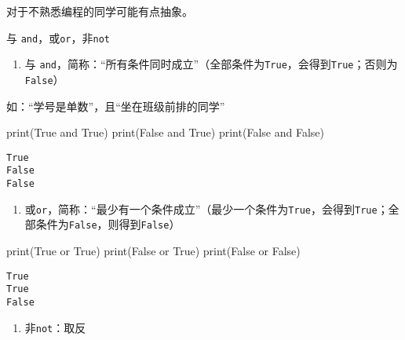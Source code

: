 \documentclass[
  letterpaper,
  DIV=11,
  numbers=noendperiod]{scrreprt}
\newenvironment{Shaded}{\begin{snugshade}}{\end{snugshade}}
\newcommand{\BuiltInTok}[1]{\textcolor[rgb]{0.00,0.23,0.31}{#1}}
\newcommand{\KeywordTok}[1]{\textcolor[rgb]{0.00,0.23,0.31}{#1}}
\newcommand{\NormalTok}[1]{\textcolor[rgb]{0.00,0.23,0.31}{#1}}
\newcommand{\VariableTok}[1]{\textcolor[rgb]{0.07,0.07,0.07}{#1}}
\providecommand{\tightlist}{%
  \setlength{\itemsep}{0pt}\setlength{\parskip}{0pt}}\usepackage{longtable,booktabs,array}
\begin{document}
对于不熟悉编程的同学可能有点抽象。

与 \texttt{and}，或\texttt{or}，非\texttt{not}

\begin{enumerate}
\def\labelenumi{\arabic{enumi}.}
\tightlist
\item
  与
  \texttt{and}，简称：``所有条件同时成立''（全部条件为\texttt{True}，会得到\texttt{True}；否则为\texttt{False}）
\end{enumerate}

如：``学号是单数''，且``坐在班级前排的同学''

\begin{Shaded}
\begin{Highlighting}[]
\BuiltInTok{print}\NormalTok{(}\VariableTok{True} \KeywordTok{and} \VariableTok{True}\NormalTok{)}
\BuiltInTok{print}\NormalTok{(}\VariableTok{False} \KeywordTok{and} \VariableTok{True}\NormalTok{)}
\BuiltInTok{print}\NormalTok{(}\VariableTok{False} \KeywordTok{and} \VariableTok{False}\NormalTok{)}
\end{Highlighting}
\end{Shaded}

\begin{verbatim}
True
False
False
\end{verbatim}

\begin{enumerate}
\def\labelenumi{\arabic{enumi}.}
\setcounter{enumi}{1}
\tightlist
\item
  或\texttt{or}，简称：``最少有一个条件成立''（最少一个条件为\texttt{True}，会得到\texttt{True}；全部条件为\texttt{False}，则得到\texttt{False}）
\end{enumerate}

\begin{Shaded}
\begin{Highlighting}[]
\BuiltInTok{print}\NormalTok{(}\VariableTok{True} \KeywordTok{or} \VariableTok{True}\NormalTok{)}
\BuiltInTok{print}\NormalTok{(}\VariableTok{False} \KeywordTok{or} \VariableTok{True}\NormalTok{)}
\BuiltInTok{print}\NormalTok{(}\VariableTok{False} \KeywordTok{or} \VariableTok{False}\NormalTok{)}
\end{Highlighting}
\end{Shaded}

\begin{verbatim}
True
True
False
\end{verbatim}

\begin{enumerate}
\def\labelenumi{\arabic{enumi}.}
\setcounter{enumi}{2}
\tightlist
\item
  非\texttt{not}：取反
\end{enumerate}
\end{document}
